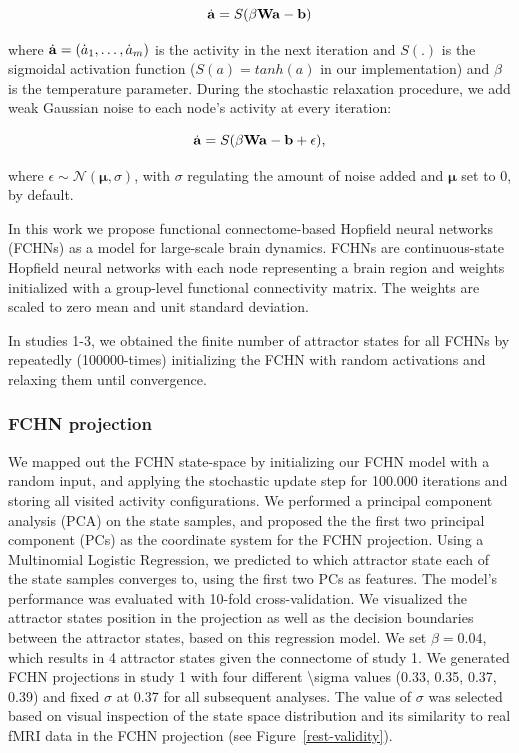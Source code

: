 \documentclass{article}
\begin{document}
\begin{equation}
\label{hopfield-update-matrix}
\dot{\bold{a}} = S(\beta \bold{W} \bold{a} - \bold{b})
\end{equation}

where $\dot{\bold{a}} = (\dot{a}_1, \dots, \dot{a}_m)$ is the activity in the next iteration and $S(.)$ is the sigmoidal activation function ($S(a) = tanh(a)$ in our implementation) and $\beta$ is the temperature parameter.
During the stochastic relaxation procedure, we add weak Gaussian noise to each node's activity at every iteration:

\begin{equation}
\label{hopfield-update-matrix-stochastic}
\dot{\bold{a}} = S(\beta \bold{W} \bold{a} - \bold{b}  + \epsilon),
\end{equation}

where $\epsilon \sim \mathcal{N}(\mathbf{\mu}, \sigma)$, with $\sigma$ regulating the amount of noise added and $\mathbf{\mu}$ set to 0, by default.

In this work we propose functional connectome-based Hopfield neural networks (FCHNs) as a model for large-scale brain dynamics. FCHNs are continuous-state Hopfield neural networks with each node representing a brain region and weights initialized with a group-level functional connectivity matrix. The weights are scaled to zero mean and unit standard deviation.

In studies 1-3, we obtained the finite number of attractor states for all FCHNs by repeatedly (100000-times) initializing the FCHN with random activations and relaxing them until convergence.

\subsubsection{FCHN projection}\label{FCHN projection}

We mapped out the FCHN state-space by initializing our FCHN model with a random input, and applying the stochastic update step for 100.000 iterations and storing all visited activity configurations.
We performed a principal component analysis (PCA) on the state samples, and proposed the the first two principal  component (PCs) as the coordinate system for the FCHN projection. Using a Multinomial Logistic Regression, we predicted to which attractor state each of the state samples converges to, using the first two PCs as features. The model's performance was evaluated with 10-fold cross-validation. We visualized the attractor states position in the projection as well as the decision boundaries between the attractor states, based on this regression model. We set $\beta = 0.04$, which results in 4 attractor states given the connectome of study 1. We  generated FCHN projections in study 1 with four different {\textbackslash}sigma values (0.33, 0.35, 0.37, 0.39) and fixed $\sigma$ at 0.37 for all subsequent analyses. The value of $\sigma$ was selected based on visual inspection of the state space distribution and its similarity to real fMRI data in the FCHN projection (see Figure~\ref{rest-validity}).
\end{document}
